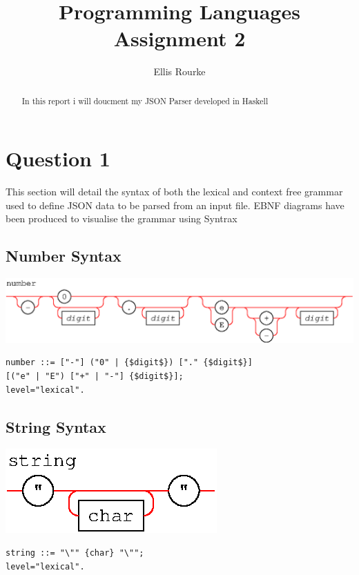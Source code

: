 \documentclass[a4paper]{article}
\begin{document}
\title{Programming Languages Assignment 2}

\author{Ellis Rourke}

\maketitle

\begin{abstract}
   In this report i will doucment my JSON Parser developed in Haskell
\end{abstract}

\section{Question 1}

This section will detail the syntax of both the lexical and context free grammar
used to define JSON data to be parsed from an input file.
EBNF diagrams have been produced to visualise the grammar using Syntrax

\subsection{Number Syntax}
{\centering
	\includegraphics[scale=0.9]{Question1/number.eps}
}
\begin{lstlisting}[frame=single]
number ::= ["-"] ("0" | {$digit$}) ["." {$digit$}] 
[("e" | "E") ["+" | "-"] {$digit$}];
level="lexical".

\end{lstlisting}

\subsection{String Syntax}
{\centering
	\includegraphics[scale=0.9]{Question1/string.eps}
}
\begin{lstlisting}[frame=single]
string ::= "\"" {char} "\"";
level="lexical".
\end{lstlisting}
\end{document}
